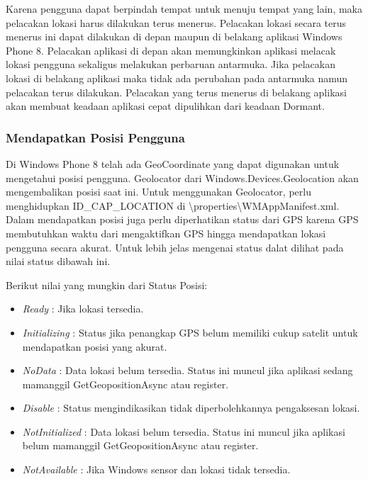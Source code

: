 \hspace{0.5cm} Karena pengguna dapat berpindah tempat untuk menuju tempat yang lain, maka pelacakan lokasi harus dilakukan terus menerus. Pelacakan lokasi secara terus menerus ini dapat dilakukan di depan maupun di belakang aplikasi Windows Phone 8. Pelacakan aplikasi di depan akan memungkinkan aplikasi melacak lokasi pengguna sekaligus melakukan perbaruan antarmuka. Jika pelacakan lokasi di belakang aplikasi maka tidak ada perubahan pada antarmuka namun pelacakan terus dilakukan. Pelacakan yang terus menerus di belakang aplikasi akan membuat keadaan aplikasi cepat dipulihkan dari keadaan Dormant.

\subsubsection{Mendapatkan Posisi Pengguna}
\label{subsubsec:Mendapatkan Posisi Pengguna}
\hspace{0.5cm} Di Windows Phone 8 telah ada GeoCoordinate yang dapat digunakan untuk mengetahui posisi pengguna. Geolocator dari Windows.Devices.Geolocation akan mengembalikan posisi saat ini. Untuk menggunakan Geolocator, perlu menghidupkan ID\_CAP\_LOCATION di \textbackslash properties\textbackslash WMAppManifest.xml. Dalam mendapatkan posisi juga perlu diperhatikan status dari GPS karena GPS membutuhkan waktu dari mengaktifkan GPS hingga mendapatkan lokasi pengguna secara akurat. Untuk lebih jelas mengenai status dalat dilihat pada nilai status dibawah ini.

Berikut nilai yang mungkin dari Status Posisi:
\begin{itemize}
	\item \textit{Ready} : Jika lokasi tersedia.
	\item \textit{Initializing} : Status jika penangkap GPS belum memiliki cukup satelit untuk mendapatkan posisi yang akurat. 
	\item \textit{NoData} : Data lokasi belum tersedia. Status ini muncul jika aplikasi sedang mamanggil GetGeopositionAsync atau register.
	\item \textit{Disable} : Status mengindikasikan tidak diperbolehkannya pengaksesan lokasi.
	\item \textit{NotInitialized} : Data lokasi belum tersedia. Status ini muncul jika aplikasi belum mamanggil GetGeopositionAsync atau register.
	\item \textit{NotAvailable} : Jika Windows sensor dan lokasi tidak tersedia.
\end{itemize}

